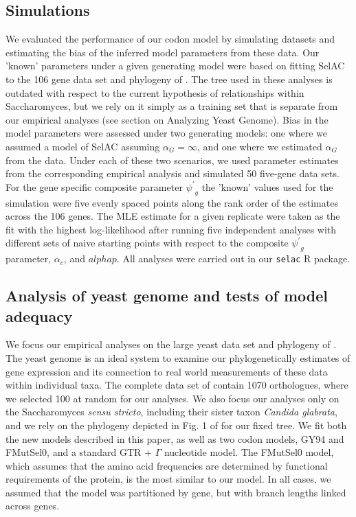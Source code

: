 \documentclass{article}
\newcommand{\alphac}{\ensuremath{\alpha_c}\xspace}
\newcommand{\alphag}{\ensuremath{\alpha_G}\xspace}
\newcommand{\psiprime}{\ensuremath{\psi^\prime}\xspace}
\begin{document}
\subsection*{Simulations}
We evaluated the performance of our codon model by simulating datasets and estimating the bias of the inferred model parameters from these data.
Our 'known' parameters under a given generating model were based on fitting SelAC to the 106 gene data set and phylogeny of \citet{RokasEtAl2003}.
The tree used in these analyses is outdated with respect to the current hypothesis of relationships within Saccharomyces, but we rely on it simply as a training set that is separate from our empirical analyses (see section on Analyzing Yeast Genome).
Bias in the model parameters were assessed under two generating models: one where we assumed a model of SelAC assuming $\alphag = \infty$, and one where we estimated $\alphag$ from the data.
Under each of these two scenarios, we used parameter estimates from the corresponding empirical analysis and simulated 50 five-gene data sets.
For the gene specific composite parameter $\psiprime_g$ the 'known' values used for the simulation were five evenly spaced points along the rank order of the estimates across the 106 genes.
The MLE estimate for a given replicate were taken as the fit with the highest log-likelihood after running five independent analyses with different sets of naive starting points with respect to the composite $\psiprime_g$ parameter, $\alphac$, and $alphap$.
All analyses were carried out in our \texttt{selac} R package.

\subsection*{Analysis of yeast genome and tests of model adequacy}
We focus our empirical analyses on the large yeast data set and phylogeny of \citet{SalichosAndRokas2013}.
The yeast genome is an ideal system to examine our phylogenetically estimates of gene expression and its connection to real world measurements of these data within individual taxa.
The complete data set of \citet{SalichosAndRokas2013} contain 1070 orthologues, where we selected 100 at random for our analyses.
We also focus our analyses only on the Saccharomyces \emph{sensu stricto}, including their sister taxon \emph{Candida glabrata}, and we rely on the phylogeny depicted in Fig. 1 of \citet{SalichosAndRokas2013} for our fixed tree.
We fit both the new models described in this paper, as well as two codon models, GY94 and FMutSel0, and a standard GTR + $\Gamma$ nucleotide model.
The FMutSel0 model, which assumes that the amino acid frequencies are determined by functional requirements of the protein, is the most similar to our model. 
In all cases, we assumed that the model was partitioned by gene, but with branch lengths linked across genes.
\end{document}
